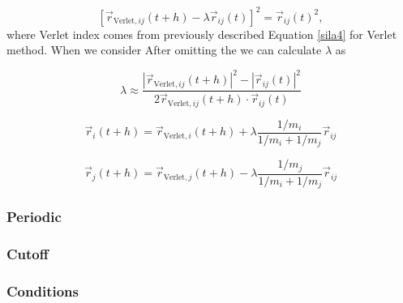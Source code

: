 \begin{equation}\label{SHAKE}
	[\vec{r}_{\text{Verlet},ij}(t + h)-\lambda\vec{r}_{ij}(t)]^2 = \vec{r}_{ij}(t)^2,
\end{equation}
where Verlet index comes from previously described Equation \ref{sila4} for Verlet method. When we consider After omitting the we can calculate $\lambda$ as

\begin{equation}\label{SHAKE_lamda}
	\lambda \approx \frac{|\vec{r}_{\text{Verlet},ij}(t + h)|^2 - |\vec{r}_{ij}(t)|^2}
	{2\vec{r}_{\text{Verlet},ij}(t + h) \cdot \vec{r}_{ij}(t)}
\end{equation}

\begin{equation}\label{SHAKE_lamdai}
	\vec{r}_i(t + h) = \vec{r}_{\text{Verlet},i}(t + h) + \lambda \frac{1/m_i}{ 1/m_i + 1/m_j} \vec{r}_{ij}
\end{equation}

\begin{equation}\label{SHAKE_lamdaj}
	\vec{r}_j(t + h) = \vec{r}_{\text{Verlet},j}(t + h) - \lambda \frac{1/m_j}{ 1/m_i + 1/m_j} \vec{r}_{ij}
\end{equation}

\subsubsection{Periodic}
\subsubsection{Cutoff}
\subsubsection{Conditions}
